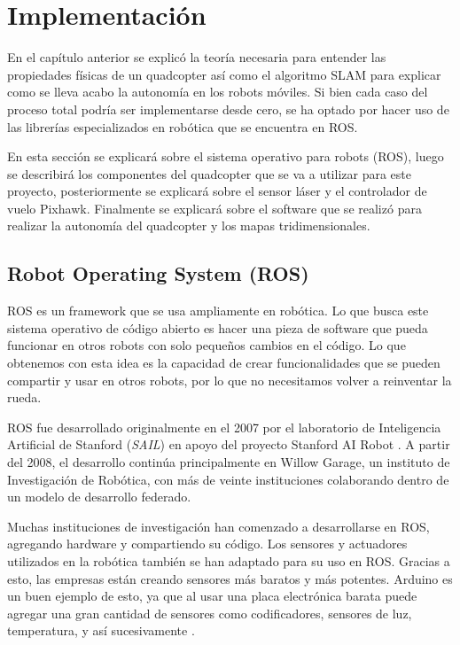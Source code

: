\chapter{Implementación}
En el capítulo anterior se explicó la teoría necesaria para entender las propiedades físicas de un quadcopter así como el algoritmo SLAM para explicar como se lleva acabo la autonomía en los robots móviles. Si bien cada caso del proceso total podría ser implementarse desde cero, se ha optado por hacer uso de las librerías especializados en robótica que se encuentra en ROS.

En esta sección se explicará sobre el sistema operativo para robots (ROS), luego se describirá los componentes del quadcopter que se va a utilizar para este proyecto, posteriormente se explicará sobre el sensor láser y el controlador de vuelo Pixhawk. Finalmente se explicará sobre el software que se realizó para realizar la autonomía del quadcopter y los mapas tridimensionales.

\section{Robot Operating System (ROS)}
ROS es un framework que se usa ampliamente en robótica. Lo que busca este sistema operativo de código abierto es hacer una pieza de software que pueda funcionar en otros robots con solo pequeños cambios en el código. Lo que obtenemos con esta idea es la capacidad de crear funcionalidades que se pueden compartir y usar en otros robots, por lo que no necesitamos volver a reinventar la rueda.

ROS fue desarrollado originalmente en el 2007 por el laboratorio de Inteligencia Artificial de Stanford (\textit{SAIL}) en apoyo del proyecto Stanford AI Robot \cite{rosHistory}. A partir del 2008, el desarrollo continúa principalmente en Willow Garage, un instituto de Investigación de Robótica, con más de veinte instituciones colaborando dentro de un modelo de desarrollo federado.

Muchas instituciones de investigación han comenzado a desarrollarse en ROS, agregando hardware y compartiendo su código. Los sensores y actuadores utilizados en la robótica también se han adaptado para su uso en ROS. Gracias a esto, las empresas están creando sensores más baratos y más potentes. Arduino es un buen ejemplo de esto, ya que al usar una placa electrónica barata puede agregar una gran cantidad de sensores como codificadores, sensores de luz, temperatura, y así sucesivamente \cite{rosIntroduction}.

